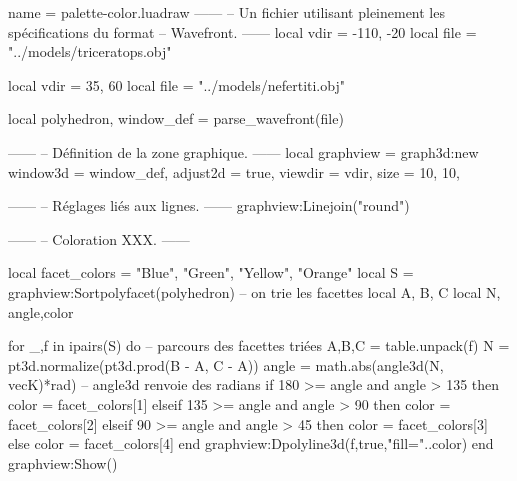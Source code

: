 \documentclass{standalone}
\begin{document}
\begin{luadraw}{name = palette-color.luadraw}
------
-- Un fichier utilisant pleinement les spécifications du format
-- Wavefront.
------
local vdir = {-110, -20}
local file = "../models/triceratops.obj"

local vdir = {35, 60}
local file = "../models/nefertiti.obj"

local polyhedron, window_def = parse_wavefront(file)

------
-- Définition de la zone graphique.
------
local graphview = graph3d:new{
  window3d = window_def,
  adjust2d = true,
  viewdir  = vdir,
  size     = {10, 10},
}

------
-- Réglages liés aux lignes.
------
graphview:Linejoin("round")

------
-- Coloration XXX.
------

local facet_colors = {"Blue", "Green", "Yellow", "Orange"}
local S = graphview:Sortpolyfacet(polyhedron) -- on trie les facettes
local A, B, C
local N, angle,color

for _,f in ipairs(S) do  -- parcours des facettes triées
  A,B,C = table.unpack(f)
  N = pt3d.normalize(pt3d.prod(B - A, C - A))
  angle = math.abs(angle3d(N, vecK)*rad) -- angle3d renvoie des radians
  if 180 >= angle and angle > 135  then
    color = facet_colors[1]
  elseif 135 >= angle and angle > 90 then
    color = facet_colors[2]
  elseif 90 >= angle and angle > 45 then
    color = facet_colors[3]
  else
    color = facet_colors[4]
  end
  graphview:Dpolyline3d(f,true,"fill="..color)
end
graphview:Show()

\end{luadraw}
\end{document}
